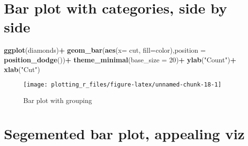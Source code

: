 \documentclass[
]{book}
\newenvironment{Shaded}{\begin{snugshade}}{\end{snugshade}}
\newcommand{\DataTypeTok}[1]{\textcolor[rgb]{0.13,0.29,0.53}{#1}}
\newcommand{\DecValTok}[1]{\textcolor[rgb]{0.00,0.00,0.81}{#1}}
\newcommand{\KeywordTok}[1]{\textcolor[rgb]{0.13,0.29,0.53}{\textbf{#1}}}
\newcommand{\NormalTok}[1]{#1}
\newcommand{\OperatorTok}[1]{\textcolor[rgb]{0.81,0.36,0.00}{\textbf{#1}}}
\newcommand{\StringTok}[1]{\textcolor[rgb]{0.31,0.60,0.02}{#1}}
\begin{document}
\hypertarget{bar-plot-with-categories-side-by-side}{%
\section{Bar plot with categories, side by side}\label{bar-plot-with-categories-side-by-side}}

\begin{Shaded}
\begin{Highlighting}[]
\KeywordTok{ggplot}\NormalTok{(diamonds)}\OperatorTok{+}
\StringTok{ }\KeywordTok{geom_bar}\NormalTok{(}\KeywordTok{aes}\NormalTok{(}\DataTypeTok{x=}\NormalTok{ cut, }\DataTypeTok{fill=}\NormalTok{color),}\DataTypeTok{position =} \KeywordTok{position_dodge}\NormalTok{())}\OperatorTok{+}
\StringTok{  }\KeywordTok{theme_minimal}\NormalTok{(}\DataTypeTok{base_size =} \DecValTok{20}\NormalTok{)}\OperatorTok{+}
\StringTok{  }\KeywordTok{ylab}\NormalTok{(}\StringTok{"Count"}\NormalTok{)}\OperatorTok{+}\StringTok{ }\KeywordTok{xlab}\NormalTok{(}\StringTok{"Cut"}\NormalTok{)}
\end{Highlighting}
\end{Shaded}

\begin{figure}

{\centering \texttt{[image: plotting\_r\_files/figure-latex/unnamed-chunk-18-1]} 

}

\caption{Bar plot with grouping}\label{fig:unnamed-chunk-18}
\end{figure}

\hypertarget{segemented-bar-plot-appealing-viz}{%
\section{Segemented bar plot, appealing viz}\label{segemented-bar-plot-appealing-viz}}
\end{document}
